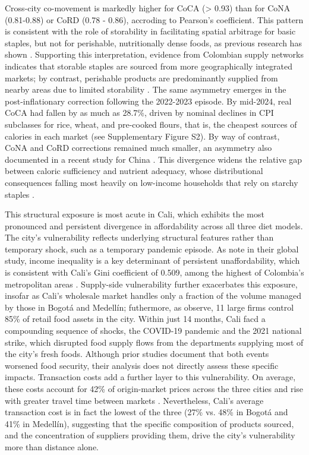\documentclass[Afour, sageh,times]{sagej}
\begin{document}
Cross-city co-movement is markedly higher for CoCA (> 0.93) than for CoNA (0.81-0.88) or CoRD (0.78 - 0.86), accroding to Pearson's coefficient. This pattern is consistent with the role of storability in facilitating spatial arbitrage for basic staples, but not for perishable, nutritionally dense foods, as previous research has shown \citep{Gilbert2010}. Supporting this interpretation, evidence from Colombian supply networks indicates that storable staples are sourced from more geographically integrated markets; by contrast, perishable products are predominantly supplied from nearby areas due to limited storability \citep{BanRep2020}. The same asymmetry emerges in the post-inflationary correction following the 2022-2023 episode. By mid-2024, real CoCA had fallen by as much as 28.7\%, driven by nominal declines in CPI subclasses for rice, wheat, and pre-cooked flours, that is, the cheapest sources of calories in each market (see Supplementary Figure S2). By way of contrast, CoNA and CoRD corrections remained much smaller, an asymmetry also documented in a recent study for China \cite{Bai2026}. This divergence widens the relative gap between caloric sufficiency and nutrient adequacy, whose distributional consequences falling most heavily on low-income households that rely on starchy staples \citep{Bai2022b, Wallingford2024}.

\smallskip

This structural exposure is most acute in Cali, which exhibits the most pronounced and persistent divergence in affordability across all three diet models. The city's vulnerability reflects underlying structural features rather than temporary shock, such as a temporary pandemic episode. As \citet{Cattaneo2023} note in their global study, income inequality is a key determinant of persistent unaffordability, which is consistent with Cali's Gini coefficient of 0.509, among the highest of Colombia's metropolitan areas \citep{Dane2024}. Supply-side vulnerability further exacerbates this exposure, insofar as Cali's wholesale market handles only a fraction of the volume managed by those in Bogotá and Medellín; futhermore, as \citet{Temple2015} observe, 11 large firms control 85\% of retail food assets in the city. Within just 14 months, Cali facd a compounding sequence of shocks, the COVID-19 pandemic and the 2021 national strike, which disrupted food supply flows from the departments supplying most of the city's fresh foods. Although prior studies \citep{Rankin2021} document that both events worsened food security, their analysis does not directly assess these specific impacts. Transaction costs add a further layer to this vulnerability. On average, these costs account for 42\% of origin-market prices across the three cities and rise with greater travel time between markets \citep{BanRep2020}. Nevertheless, Cali's average transaction cost is in fact the lowest of the three (27\% vs. 48\% in Bogotá and 41\% in Medellín), suggesting that the specific composition of products sourced, and the concentration of suppliers providing them, drive the city's vulnerability more than distance alone.
\end{document}
